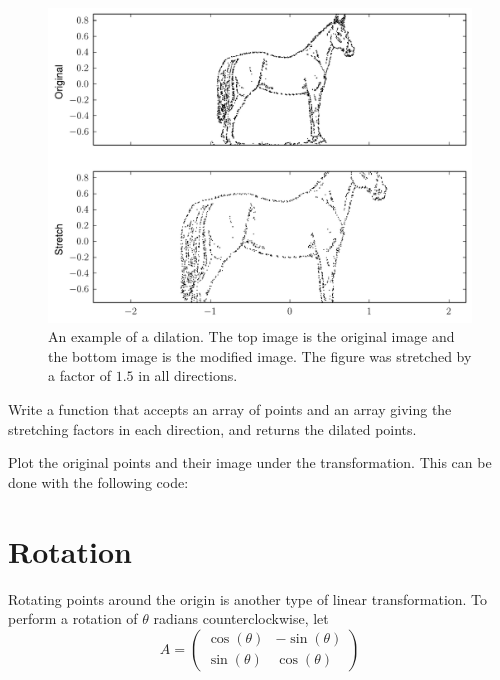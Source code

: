 \begin{figure}
\includegraphics[width=\textwidth]{stretch.pdf}
\caption{An example of a dilation. The top image is the original image and the bottom image is the modified image. The figure was stretched by a factor of $1.5$ in all directions.}
\end{figure}

\begin{problem}
Write a function that accepts an array of points and an array giving the stretching factors in each direction, and returns the dilated points. 

Plot the original points and their image under the transformation. This can be done with the following code:



\end{problem}

\section*{Rotation}
Rotating points around the origin is another type of linear transformation. To perform a rotation of $\theta$ radians counterclockwise, let
\[
A = \begin{pmatrix}
\cos(\theta) & -\sin(\theta) \\
\sin(\theta) & \cos(\theta)
\end{pmatrix}
\]

